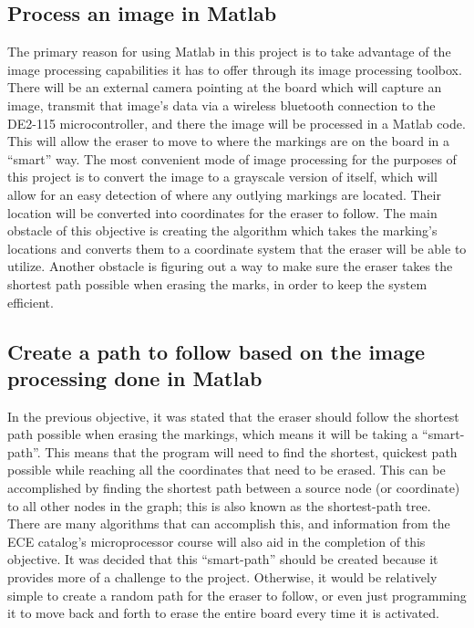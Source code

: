 \documentclass{IEEEtran}					%
\begin{document}
	\subsection{Process an image in Matlab}
	The primary reason for using Matlab in this project is to take advantage of the image processing capabilities it has to offer through its image processing toolbox. There will be an external camera pointing at the board which will capture an image, transmit that image{\rq}s data via a wireless bluetooth connection to the DE2-115 microcontroller, and there the image will be processed in a Matlab code. This will allow the eraser to move to where the markings are on the board in a ``smart'' way. The most convenient mode of image processing for the purposes of this project is to convert the image to a grayscale version of itself, which will allow for an easy detection of where any outlying markings are located. Their location will be converted into coordinates for the eraser to follow. The main obstacle of this objective is creating the algorithm which takes the marking{\rq}s locations and converts them to a coordinate system that the eraser will be able to utilize. Another obstacle is figuring out a way to make sure the eraser takes the shortest path possible when erasing the marks, in order to keep the system efficient.
	
	\subsection{Create a path to follow based on the image processing done in Matlab}
	In the previous objective, it was stated that the eraser should follow the shortest path possible when erasing the markings, which means it will be taking a ``smart-path''. This means that the program will need to find the shortest, quickest path possible while reaching all the coordinates that need to be erased. This can be accomplished by finding the shortest path between a source node (or coordinate) to all other nodes in the graph; this is also known as the shortest-path tree. There are many algorithms that can accomplish this, and information from the ECE catalog{\rq}s microprocessor course will also aid in the completion of this objective. It was decided that this ``smart-path'' should be created because it provides more of a challenge to the project. Otherwise, it would be relatively simple to create a random path for the eraser to follow, or even just programming it to move back and forth to erase the entire board every time it is activated.
	
\end{document}
